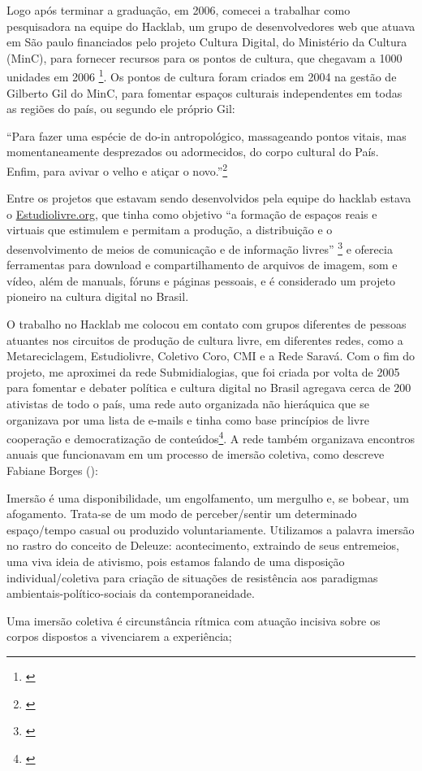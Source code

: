 Logo após terminar a graduação, em 2006, comecei a trabalhar como pesquisadora na equipe do Hacklab, um grupo de desenvolvedores web que atuava em São paulo financiados pelo projeto Cultura Digital, do Ministério da Cultura (MinC), para fornecer recursos para os pontos de cultura, que chegavam a 1000 unidades em 2006 \footnote{\cite[6]{Lima2009}}. Os pontos de cultura foram criados em 2004 na gestão de Gilberto Gil do MinC, para fomentar espaços culturais independentes em todas as regiões do país, ou segundo ele próprio Gil:
\begin{citacao}

``Para fazer uma espécie de do-in antropológico, massageando pontos vitais, mas momentaneamente desprezados ou adormecidos, do corpo cultural do País. Enfim, para avivar o velho e atiçar o novo.''\footnote{\cite{GilbertoGil2003}} 
\end{citacao}

Entre os projetos que estavam sendo desenvolvidos pela equipe do hacklab estava o \url{Estudiolivre.org}, que tinha como objetivo ``a formação de espaços reais e virtuais que estimulem e permitam a produção, a distribuição e o desenvolvimento de meios de comunicação e de informação livres'' \footnote{\cite[12]{Lima2009}} e oferecia ferramentas para download e compartilhamento de arquivos de imagem, som e vídeo, além de manuals, fóruns e páginas pessoais, e é considerado um projeto pioneiro na cultura digital no Brasil.  


O trabalho no Hacklab me colocou em contato com grupos diferentes de pessoas atuantes nos circuitos de produção de cultura livre, em diferentes redes, como a Metareciclagem, Estudiolivre, Coletivo Coro, CMI e a Rede Saravá. Com o fim do projeto, me aproximei da rede Submidialogias, que foi criada por volta de 2005 para fomentar e debater política e cultura digital no Brasil agregava cerca de 200 ativistas de todo o país, uma rede auto organizada não hieráquica que se organizava por uma lista de e-mails e tinha como base princípios de livre cooperação e democratização de conteúdos\footnote{\cite{Brunet}}. A rede também organizava encontros anuais que funcionavam em um processo de imersão coletiva, como descreve Fabiane Borges (\citeyear{FabianeMoraesBorges2010}):

\begin{citacao}
Imersão é uma disponibilidade, um engolfamento, um mergulho e, se bobear, um afogamento. Trata-se de um modo de perceber/sentir um determinado espaço/tempo casual ou produzido voluntariamente. Utilizamos a palavra imersão no rastro do conceito de Deleuze: acontecimento, extraindo de seus entremeios, uma viva ideia de ativismo, pois estamos falando de uma disposição individual/coletiva para criação de situações de resistência aos paradigmas ambientais-político-sociais da contemporaneidade.

Uma imersão coletiva é circunstância rítmica com atuação incisiva sobre os corpos dispostos a vivenciarem a experiência;
\end{citacao}
 
